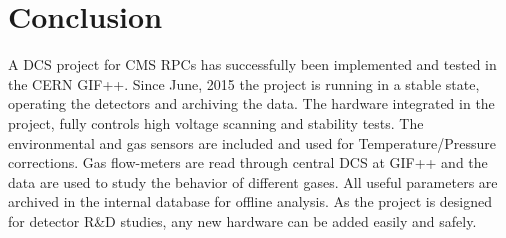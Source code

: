 
\section{Conclusion} 
A DCS project for CMS RPCs has successfully been implemented and tested in the CERN GIF++. Since June, 2015 the project is running in a stable state, operating the detectors and archiving the data. The hardware integrated in the project, fully controls high voltage scanning and stability tests. The environmental and gas sensors are included and used for Temperature/Pressure corrections. Gas flow-meters are read through central DCS at GIF++ and the data are used to study the behavior of different gases. All useful parameters are archived in the internal database for offline analysis. As the project is designed for detector R\&D studies, any new hardware can be added easily and safely.\\




\clearpage{\pagestyle{empty}\cleardoublepage}
